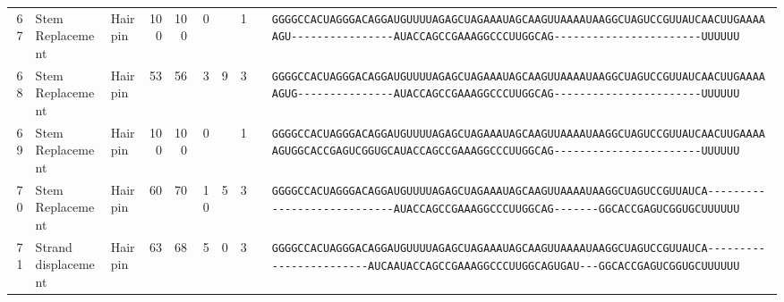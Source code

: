 \begin{tabular}{rllrrrrrcl}
\midrule

 67 & Stem Replacement & Hairpin & 100 & 100 & 0 &  & 1 &  &
 \color{ucsfdarkgrey}\verb|GGGGCCACUAGGGACAGGAU|\color{ucsforange}\verb|GUUUUA|\color{ucsfblue}\verb|GAGCUAGAAAUAGCAAGU|\color{ucsforange}\verb|UAAAAUAA|\color{ucsfnavy}\verb|GGCUAGUCCGU|\color{ucsforange}\verb|UAUCA|\color{ucsfteal}\verb|ACUUGAAAAAGU-|\color{ucsforange}\verb|---------------|\color{ucsfpurple}\verb|AUACCAGCCGAAAGGCCCUUGGCAG|\color{ucsforange}\verb|-----------------------UUUUUU| \\

 68 & Stem Replacement & Hairpin & 53 & 56 & 3 & 9 & 3 &  &
 \color{ucsfdarkgrey}\verb|GGGGCCACUAGGGACAGGAU|\color{ucsforange}\verb|GUUUUA|\color{ucsfblue}\verb|GAGCUAGAAAUAGCAAGU|\color{ucsforange}\verb|UAAAAUAA|\color{ucsfnavy}\verb|GGCUAGUCCGU|\color{ucsforange}\verb|UAUCA|\color{ucsfteal}\verb|ACUUGAAAAAGUG|\color{ucsforange}\verb|---------------|\color{ucsfpurple}\verb|AUACCAGCCGAAAGGCCCUUGGCAG|\color{ucsforange}\verb|-----------------------UUUUUU| \\

 69 & Stem Replacement & Hairpin & 100 & 100 & 0 &  & 1 &  &
 \color{ucsfdarkgrey}\verb|GGGGCCACUAGGGACAGGAU|\color{ucsforange}\verb|GUUUUA|\color{ucsfblue}\verb|GAGCUAGAAAUAGCAAGU|\color{ucsforange}\verb|UAAAAUAA|\color{ucsfnavy}\verb|GGCUAGUCCGU|\color{ucsforange}\verb|UAUCA|\color{ucsfteal}\verb|ACUUGAAAAAGU|\color{ucsforange}\verb|GGCACCGAGUCGGUGC|\color{ucsfpurple}\verb|AUACCAGCCGAAAGGCCCUUGGCAG|\color{ucsforange}\verb|-----------------------UUUUUU| \\

 70 & Stem Replacement & Hairpin & 60 & 70 & 10 & 5 & 3 &  &
 \color{ucsfdarkgrey}\verb|GGGGCCACUAGGGACAGGAU|\color{ucsforange}\verb|GUUUUA|\color{ucsfblue}\verb|GAGCUAGAAAUAGCAAGU|\color{ucsforange}\verb|UAAAAUAA|\color{ucsfnavy}\verb|GGCUAGUCCGU|\color{ucsforange}\verb|UAUCA|\color{ucsfteal}\verb|----------------------------|\color{ucsfpurple}\verb|AUACCAGCCGAAAGGCCCUUGGCAG|\color{ucsfteal}\verb|-------|\color{ucsforange}\verb|GGCACCGAGUCGGUGCUUUUUU| \\

 71 & Strand displacement & Hairpin & 63 & 68 & 5 & 0 & 3 &  &
 \color{ucsfdarkgrey}\verb|GGGGCCACUAGGGACAGGAU|\color{ucsforange}\verb|GUUUUA|\color{ucsfblue}\verb|GAGCUAGAAAUAGCAAGU|\color{ucsforange}\verb|UAAAAUAA|\color{ucsfnavy}\verb|GGCUAGUCCGU|\color{ucsforange}\verb|UAUCA|\color{ucsfteal}\verb|------------------------AUCA|\color{ucsfpurple}\verb|AUACCAGCCGAAAGGCCCUUGGCAG|\color{ucsfteal}\verb|UGAU---|\color{ucsforange}\verb|GGCACCGAGUCGGUGCUUUUUU| \\


\end{tabular}
